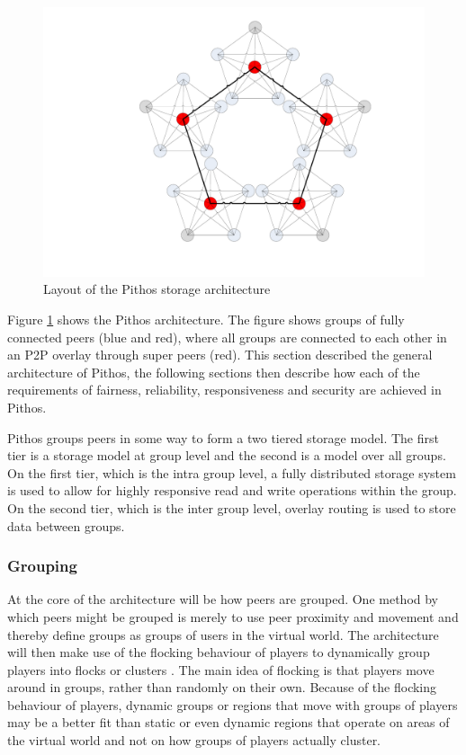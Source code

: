 \documentclass[10pt,a4paper,conference]{IEEEtran}
\begin{document}
\begin{figure}[htbp]
 \centering
 \includegraphics[clip=true, viewport=7.5cm 2.5cm 26cm 20cm, width=0.7\columnwidth]{CDHT_layout}
 \caption{Layout of the Pithos storage architecture}
 \label{fig_pithos}
\end{figure}
%
Figure \ref{fig_pithos} shows the Pithos architecture. The figure shows groups of fully connected peers (blue and red), where all groups are
connected to each other in an P2P overlay through super peers (red). This section described the general architecture of Pithos, the following
sections then describe how each of the requirements of fairness, reliability, responsiveness and security are achieved in Pithos.

Pithos groups peers in some way to form a two tiered storage model. The first tier is a storage model at group level and the second is a model over
all groups. On the first tier, which is the intra group level, a fully distributed storage system is used to allow for highly responsive read and
write operations within the group. On the second tier, which is the inter group level, overlay routing is used to store data between groups.

\subsubsection{Grouping}

At the core of the architecture will be how peers are grouped. One method by which peers might be grouped is merely to use peer proximity and
movement and thereby define groups as groups of users in the virtual world. The architecture will then make use of the flocking behaviour of players
to dynamically group players into flocks or clusters \cite{flocking}. The main idea of flocking is that players move around in groups, rather than
randomly on their own. Because of the flocking behaviour of players, dynamic groups or regions that move with groups of players may be a better fit
than static or even dynamic regions that operate on areas of the virtual world and not on how groups of players actually cluster.
\end{document}

